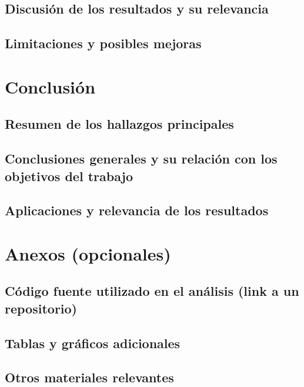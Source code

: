 \documentclass[a4paper]{report}
\begin{document}
\section{Discusión de los resultados y su relevancia}

\section{Limitaciones y posibles mejoras}





\chapter{Conclusión}

\section{Resumen de los hallazgos principales}

\section{Conclusiones generales y su relación con los objetivos del trabajo}

\section{Aplicaciones y relevancia de los resultados}


\printbibliography[heading=bibintoc] %



\chapter*{Anexos (opcionales)}

\section{Código fuente utilizado en el análisis (link a un repositorio)}
\section{Tablas y gráficos adicionales}
\section{Otros materiales relevantes}
\end{document}
